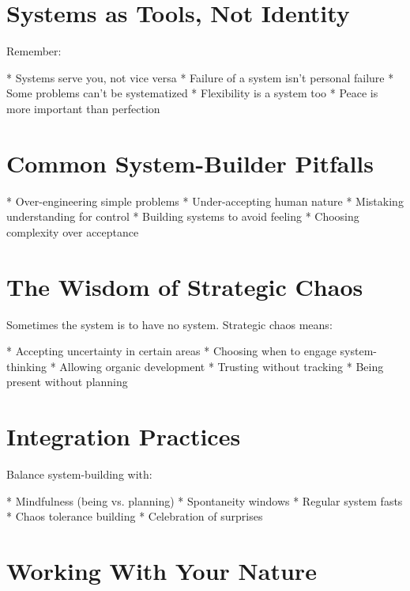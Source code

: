 \documentclass[12pt,oneside]{book}
\begin{document}
\section{Systems as Tools, Not Identity}

Remember:

                    * Systems serve you, not vice versa
                    * Failure of a system isn't personal failure
                    * Some problems can't be systematized
                    * Flexibility is a system too
                    * Peace is more important than perfection

\section{Common System-Builder Pitfalls}

                    * Over-engineering simple problems
                    * Under-accepting human nature
                    * Mistaking understanding for control
                    * Building systems to avoid feeling
                    * Choosing complexity over acceptance

\section{The Wisdom of Strategic Chaos}

Sometimes the system is to have no system. Strategic chaos means:

                    * Accepting uncertainty in certain areas
                    * Choosing when to engage system-thinking
                    * Allowing organic development
                    * Trusting without tracking
                    * Being present without planning

\section{Integration Practices}

Balance system-building with:

                    * Mindfulness (being vs. planning)
                    * Spontaneity windows
                    * Regular system fasts
                    * Chaos tolerance building
                    * Celebration of surprises

\section{Working With Your Nature}
\end{document}
